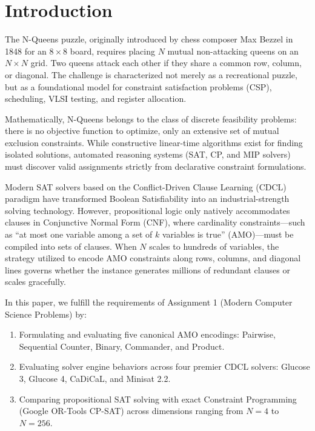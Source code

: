 \documentclass[a4paper,fleqn]{cas-sc}
\begin{document}
\maketitle

\section{Introduction}
The N-Queens puzzle, originally introduced by chess composer Max Bezzel in 1848 for an $8 \times 8$ board, requires placing $N$ mutual non-attacking queens on an $N \times N$ grid. Two queens attack each other if they share a common row, column, or diagonal. The challenge is characterized not merely as a recreational puzzle, but as a foundational model for constraint satisfaction problems (CSP), scheduling, VLSI testing, and register allocation.

Mathematically, N-Queens belongs to the class of discrete feasibility problems: there is no objective function to optimize, only an extensive set of mutual exclusion constraints. While constructive linear-time algorithms exist for finding isolated solutions, automated reasoning systems (SAT, CP, and MIP solvers) must discover valid assignments strictly from declarative constraint formulations.

Modern SAT solvers based on the Conflict-Driven Clause Learning (CDCL) paradigm have transformed Boolean Satisfiability into an industrial-strength solving technology. However, propositional logic only natively accommodates clauses in Conjunctive Normal Form (CNF), where cardinality constraints---such as ``at most one variable among a set of $k$ variables is true'' ($\text{AMO}$)---must be compiled into sets of clauses. When $N$ scales to hundreds of variables, the strategy utilized to encode AMO constraints along rows, columns, and diagonal lines governs whether the instance generates millions of redundant clauses or scales gracefully.

In this paper, we fulfill the requirements of Assignment 1 (Modern Computer Science Problems) by:
\begin{enumerate}
    \item Formulating and evaluating five canonical AMO encodings: Pairwise, Sequential Counter, Binary, Commander, and Product.
    \item Evaluating solver engine behaviors across four premier CDCL solvers: Glucose 3, Glucose 4, CaDiCaL, and Minisat 2.2.
    \item Comparing propositional SAT solving with exact Constraint Programming (Google OR-Tools CP-SAT) across dimensions ranging from $N = 4$ to $N = 256$.
\end{enumerate}
\end{document}
